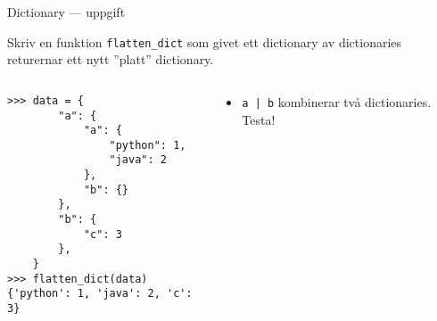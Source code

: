 \documentclass{beamer}
\begin{document}
  \begin{frame}[fragile]{Dictionary --- uppgift}

    Skriv en funktion \texttt{flatten\_dict} som givet ett dictionary av
    dictionaries returernar ett nytt ''platt'' dictionary.

    \begin{columns}
      \begin{column}{0.48\textwidth}
        \begin{verbatim}
>>> data = {
        "a": {
            "a": {
                "python": 1,
                "java": 2
            },
            "b": {}
        },
        "b": {
            "c": 3
        },
    }
>>> flatten_dict(data)
{'python': 1, 'java': 2, 'c': 3}
        \end{verbatim}
      \end{column}
      \begin{column}{0.48\textwidth}

        \begin{itemize}
          \item \texttt{a | b} kombinerar två dictionaries. Testa!
        \end{itemize}

      \end{column}
    \end{columns}

  \end{frame}
\end{document}
